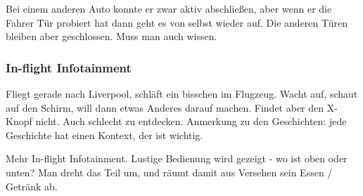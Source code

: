 Bei einem anderen Auto konnte er zwar aktiv abschließen, aber wenn er die Fahrer
Tür probiert hat dann geht es von selbst wieder auf. 
Die anderen Türen bleiben aber geschlossen. 
Muss man auch wissen.

\subsubsection{In-flight Infotainment}
Fliegt gerade nach Liverpool, schläft ein bisschen im Flugzeug. 
Wacht auf, schaut auf den Schirm, will dann etwas Anderes darauf machen. 
Findet aber den X-Knopf nicht. Auch schlecht zu entdecken.
Anmerkung zu den Geschichten: jede Geschichte hat einen Kontext, der ist wichtig.

Mehr In-flight Infotainment. 
Lustige Bedienung wird gezeigt - wo ist oben oder unten?
Man dreht das Teil um, und räumt damit aus Versehen sein Essen / Getränk ab. 

